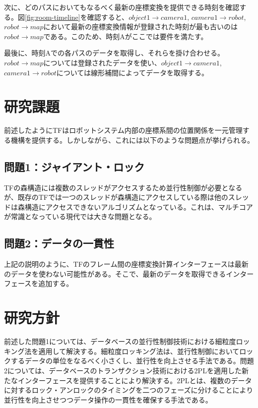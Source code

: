 \documentclass[a4paper]{jreport}	%
\begin{document}
次に、どのパスにおいてもなるべく最新の座標変換を提供できる時刻を確認する。図\ref{fig:room-timeline}を確認すると、$object1 \rightarrow camera1$, $camera1 \rightarrow robot$, $robot \rightarrow map$において最新の座標変換情報が登録された時刻が最も古いのは$robot \rightarrow map$である。このため、時刻Aがここでは要件を満たす。

最後に、時刻Aでの各パスのデータを取得し、それらを掛け合わせる。$robot \rightarrow map$については登録されたデータを使い、$object1 \rightarrow camera1$, $camera1 \rightarrow robot$については線形補間によってデータを取得する。

\section{研究課題}
前述したようにTFはロボットシステム内部の座標系間の位置関係を一元管理する機構を提供する。しかしながら、これには以下のような問題点が挙げられる。

\subsection*{問題1：ジャイアント・ロック}
TFの森構造には複数のスレッドがアクセスするため並行性制御が必要となるが、既存のTFでは一つのスレッドが森構造にアクセスしている際は他のスレッドは森構造にアクセスできないアルゴリズムとなっている。これは、マルチコアが常識となっている現代では大きな問題となる。

\subsection*{問題2：データの一貫性}

上記の説明のように、TFのフレーム間の座標変換計算インターフェースは最新のデータを使わない可能性がある。そこで、最新のデータを取得できるインターフェースを追加する。

\section{研究方針}
前述した問題1については、データベースの並行性制御技術における細粒度ロッキング法を適用して解決する。細粒度ロッキング法は、並行性制御においてロックするデータの単位をなるべく小さくし、並行性を向上させる手法である。問題2については、データベースのトランザクション技術における2PLを適用した新たなインターフェースを提供することにより解決する。2PLとは、複数のデータに対するロック・アンロックのタイミングを二つのフェーズに分けることにより並行性を向上させつつデータ操作の一貫性を確保する手法である。
\end{document}
